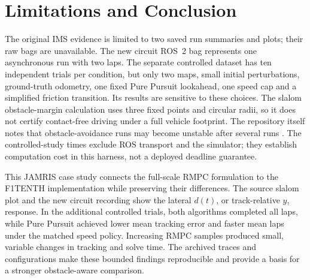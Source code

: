 \documentclass{jamris}
\begin{document}
\section{Limitations and Conclusion}
The original IMS evidence is limited to two saved run summaries and plots; their raw bags are unavailable. The new circuit ROS~2 bag represents one asynchronous run with two laps. The separate controlled dataset has ten independent trials per condition, but only two maps, small initial perturbations, ground-truth odometry, one fixed Pure Pursuit lookahead, one speed cap and a simplified friction transition. Its results are sensitive to these choices. The slalom obstacle-margin calculation uses three fixed points and circular radii, so it does not certify contact-free driving under a full vehicle footprint. The repository itself notes that obstacle-avoidance runs may become unstable after several runs \cite{mulakaloori2026repo}. The controlled-study times exclude ROS transport and the simulator; they establish computation cost in this harness, not a deployed deadline guarantee.

This JAMRIS case study connects the full-scale RMPC formulation to the F1TENTH implementation while preserving their differences. The source slalom plot and the new circuit recording show the lateral $d(t)$, or track-relative $y$, response. In the additional controlled trials, both algorithms completed all laps, while Pure Pursuit achieved lower mean tracking error and faster mean laps under the matched speed policy. Increasing RMPC samples produced small, variable changes in tracking and solve time. The archived traces and configurations make these bounded findings reproducible and provide a basis for a stronger obstacle-aware comparison.

\AuthorNote
\raggedend


\end{document}
